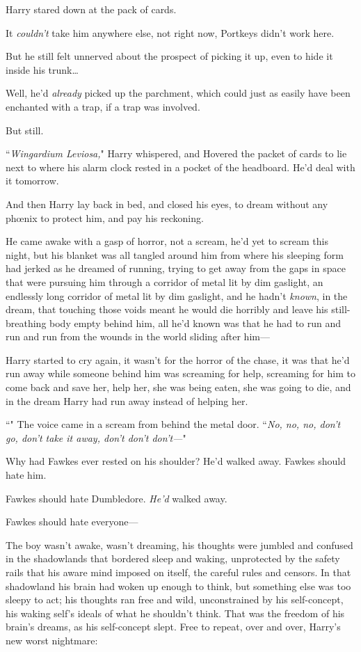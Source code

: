 Harry stared down at the pack of cards.

It \emph{couldn't} take him anywhere else, not right now, Portkeys didn't work here.

But he still felt unnerved about the prospect of picking it up, even to hide it inside his trunk{\ldots}

Well, he'd \emph{already} picked up the parchment, which could just as easily have been enchanted with a trap, if a trap was involved.

But still.

``\emph{Wingardium Leviosa,}" Harry whispered, and Hovered the packet of cards to lie next to where his alarm clock rested in a pocket of the headboard. He'd deal with it tomorrow.

And then Harry lay back in bed, and closed his eyes, to dream without any phœnix to protect him, and pay his reckoning.

\later

He came awake with a gasp of horror, not a scream, he'd yet to scream this night, but his blanket was all tangled around him from where his sleeping form had jerked as he dreamed of running, trying to get away from the gaps in space that were pursuing him through a corridor of metal lit by dim gaslight, an endlessly long corridor of metal lit by dim gaslight, and he hadn't \emph{known}, in the dream, that touching those voids meant he would die horribly and leave his still-breathing body empty behind him, all he'd known was that he had to run and run and run from the wounds in the world sliding after him---

Harry started to cry again, it wasn't for the horror of the chase, it was that he'd run away while someone behind him was screaming for help, screaming for him to come back and save her, help her, she was being eaten, she was going to die, and in the dream Harry had run away instead of helping her.

``" The voice came in a scream from behind the metal door. ``\emph{No, no, no, don't go, don't take it away, don't don't don't---}"

Why had Fawkes ever rested on his shoulder? He'd walked away. Fawkes should hate him.

Fawkes should hate Dumbledore. \emph{He'd} walked away.

Fawkes should hate everyone---

The boy wasn't awake, wasn't dreaming, his thoughts were jumbled and confused in the shadowlands that bordered sleep and waking, unprotected by the safety rails that his aware mind imposed on itself, the careful rules and censors. In that shadowland his brain had woken up enough to think, but something else was too sleepy to act; his thoughts ran free and wild, unconstrained by his self-concept, his waking self's ideals of what he shouldn't think. That was the freedom of his brain's dreams, as his self-concept slept. Free to repeat, over and over, Harry's new worst nightmare:

